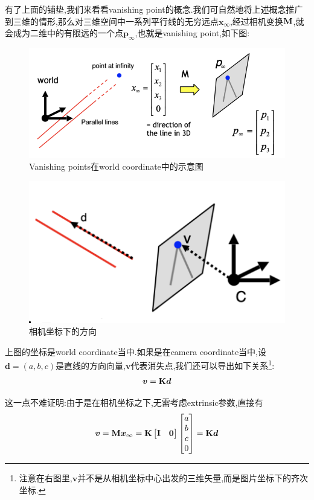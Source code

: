 有了上面的铺垫,我们来看看vanishing point的概念.我们可自然地将上述概念推广到三维的情形,那么对三维空间中一系列平行线的无穷远点$\bm x_\infty$,经过相机变换$\bold{M}$,就会成为二维中的有限远的一个点$\bm p_\infty$,也就是vanishing point,如下图:
\begin{figure}[htbp]
	\centering
	\includegraphics[scale=0.65]{figures/vanishingpoints.png}
	\caption{Vanishing points在world coordinate中的示意图}
	\label{}
\end{figure}

\begin{figure}
	\includegraphics[scale=0.5]{figures/vpanddir.png}
	\caption{相机坐标下的方向}
\end{figure}
上图的坐标是world coordinate当中.如果是在camera coordinate当中,设$\bm d = (a, b, c)$是直线的方向向量,$\bm v$代表消失点,我们还可以导出如下关系\footnote{注意在右图里,$\bm v$并不是从相机坐标中心出发的三维矢量,而是图片坐标下的齐次坐标.}:
\begin{equation}
	\boldsymbol v = \bold{K} \boldsymbol d
\end{equation}


这一点不难证明:由于是在相机坐标之下,无需考虑extrinsic参数,直接有
\begin{equation}
	\boldsymbol v = \bold{M} \boldsymbol x_\infty = \bold{K} 
	\begin{bmatrix}
		\bold{I} & \boldsymbol 0
	\end{bmatrix}
	\begin{bmatrix}
		a\\b\\c\\0
	\end{bmatrix} = \bold{K} \boldsymbol d
\end{equation}

